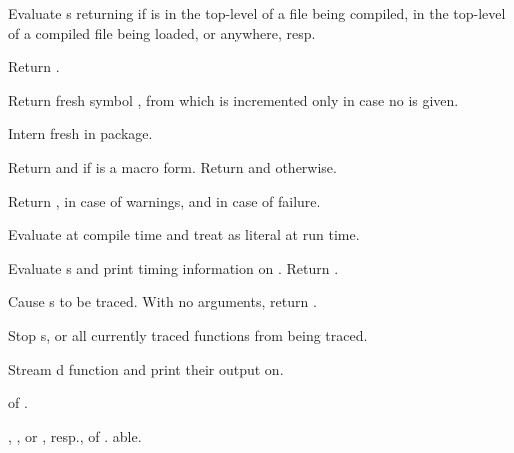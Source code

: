 \begin{LIST}{1cm}
  Evaluate s returning
   if  is in the
  top-level of a file being compiled, in the top-level of a compiled file being
  loaded, or anywhere, resp.

  Return .

  Return fresh symbol ,  from
   which is incremented only in case no  is given.

  Intern fresh  in package.

  Return  and \retval{\T} if
   is a macro form. 
  Return  and \retval{\NIL} otherwise.

  Return  , \retvalii{\T} in case
  of warnings, and \retvaliii{\T} in case of failure.

  Evaluate  at compile time and treat  as literal
  at run time.

  Evaluate s and print timing information on .
  Return .
  
  Cause s to be traced. With no arguments,
  return .

  Stop s, or all currently traced functions from being traced.

  Stream d function and  print their output on.
  

   of .

  , , or , resp., of . able.


\end{LIST}

